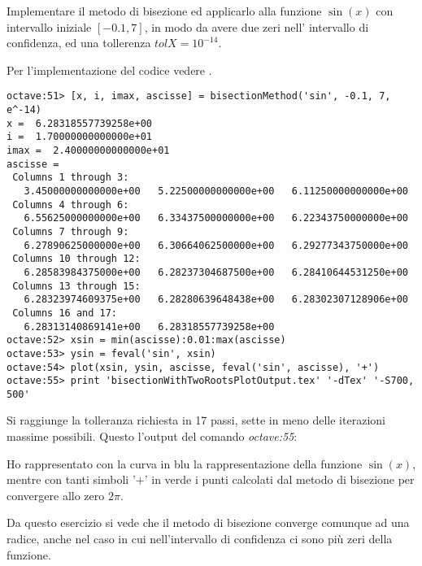 \begin{exercise}
Implementare il metodo di bisezione ed applicarlo alla funzione $\sin(x)$ 
con intervallo iniziale $[-0.1, 7]$, in modo da avere due zeri nell'
intervallo di confidenza, ed una tollerenza $tolX = 10^{-14}$.
\end{exercise}
Per l'implementazione del codice vedere .
\begin{lstlisting}
octave:51> [x, i, imax, ascisse] = bisectionMethod('sin', -0.1, 7, e^-14)
x =  6.28318557739258e+00
i =  1.70000000000000e+01
imax =  2.40000000000000e+01
ascisse =
 Columns 1 through 3:
   3.45000000000000e+00   5.22500000000000e+00   6.11250000000000e+00
 Columns 4 through 6:
   6.55625000000000e+00   6.33437500000000e+00   6.22343750000000e+00
 Columns 7 through 9:
   6.27890625000000e+00   6.30664062500000e+00   6.29277343750000e+00
 Columns 10 through 12:
   6.28583984375000e+00   6.28237304687500e+00   6.28410644531250e+00
 Columns 13 through 15:
   6.28323974609375e+00   6.28280639648438e+00   6.28302307128906e+00
 Columns 16 and 17:
   6.28313140869141e+00   6.28318557739258e+00
octave:52> xsin = min(ascisse):0.01:max(ascisse)
octave:53> ysin = feval('sin', xsin)
octave:54> plot(xsin, ysin, ascisse, feval('sin', ascisse), '+')
octave:55> print 'bisectionWithTwoRootsPlotOutput.tex' '-dTex' '-S700, 500'
\end{lstlisting}
Si raggiunge la tolleranza richiesta in 17 passi, sette in meno delle iterazioni massime possibili. Questo l'output del comando \emph{octave:55}:
\begin{center}

\end{center}
Ho rappresentato con la curva in blu la rappresentazione della funzione 
$\sin(x)$, mentre con tanti simboli '$+$' in verde i punti calcolati dal
metodo di bisezione per convergere allo zero $2\pi$.

Da questo esercizio si vede che il metodo di bisezione converge comunque
ad una radice, anche nel caso in cui nell'intervallo di confidenza ci sono
pi\`u zeri della funzione.




